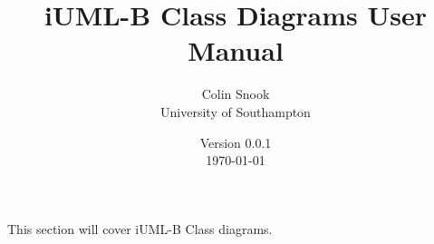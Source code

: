 \documentclass[a4paper,10pt]{article}
\title{iUML-B Class Diagrams User Manual}
\author{Colin Snook\\University of Southampton}
\date{%
	Version 0.0.1\\%
	\today%
}
\begin{document}
	\ifplastex%
	\maketitle%
	\else%
	\ifstandalone%
	\maketitle %
	\else%
	\fi%
	\fi%
	
	This section will cover iUML-B Class diagrams.
	
	
	
	
	
	
	
	
	
\end{document}
